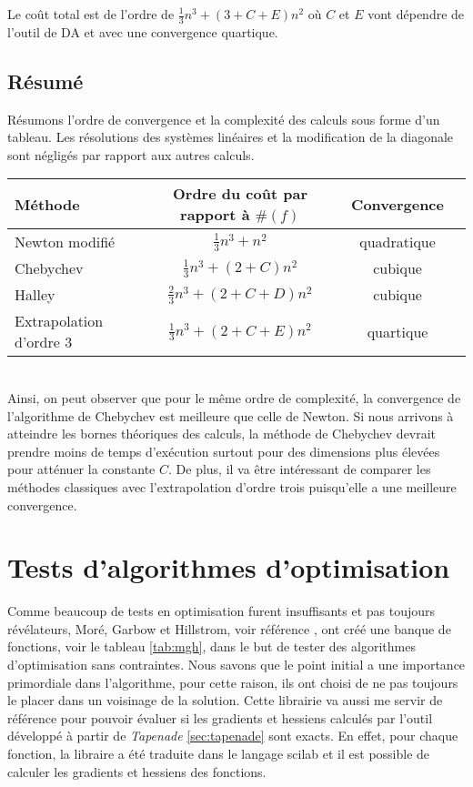 Le coût total est de l'ordre de $\frac{1}{3}n^3 +(3+C+E)n^2$ o\`u $C$ et $E$ vont d\'ependre de l'outil de DA et avec une convergence
quartique.



\subsection{R\'esum\'e}
R\'esumons l'ordre de convergence et la complexit\'e des calculs sous forme d'un tableau. Les r\'esolutions des syst\`emes lin\'eaires
et la modification de la diagonale sont n\'eglig\'es par rapport aux autres calculs.\\

\begin{tabular}{|l|c|c|c|}\hline
M\'ethode & Ordre du coût par rapport \`a $\#(f)$ & Convergence \\
\hline
Newton modifi\'e& $\frac{1}{3}n^3+n^2$ & quadratique\\
Chebychev & $\frac{1}{3}n^3+(2+C)n^2$  & cubique \\
Halley & $\frac{2}{3}n^3+(2+C+D)n^2$ & cubique \\
Extrapolation d'ordre 3 & $\frac{1}{3}n^3 +(2+C+E)n^2$  & quartique \\
\hline
\end{tabular}\\


\noindent
Ainsi, on peut observer que pour le même ordre de complexit\'e, la convergence de l'algorithme de 
Chebychev est meilleure que celle de Newton. Si nous arrivons \`a atteindre les bornes th\'eoriques des calculs, la m\'ethode 
de Chebychev devrait prendre moins de temps d'ex\'ecution surtout pour des dimensions plus \'elev\'ees pour att\'enuer la constante $C$.
De plus, il va être int\'eressant de comparer les m\'ethodes classiques avec l'extrapolation d'ordre trois puisqu'elle a une meilleure
convergence.





\section{Tests d'algorithmes d'optimisation}

Comme beaucoup de tests en optimisation furent insuffisants et pas toujours r\'ev\'elateurs, Mor\'e, Garbow et Hillstrom, voir r\'ef\'erence 
\cite{355936}, ont cr\'e\'e une banque de fonctions, {\co voir le tableau \ref{tab:mgh}}, dans le but de tester des algorithmes d'optimisation sans contraintes.
 Nous savons que le point initial a une importance primordiale dans l'algorithme, pour cette raison, ils ont choisi de ne 
pas toujours le placer dans un voisinage de la solution. 
Cette librairie va aussi me servir de r\'ef\'erence pour pouvoir \'evaluer si les gradients et hessiens calcul\'es par l'outil d\'evelopp\'e \`a partir de {\it Tapenade} \ref{sec:tapenade}
 sont exacts. En effet, pour chaque fonction, la libraire a \'et\'e traduite dans le langage scilab et il est possible de calculer les gradients
et hessiens des fonctions.



